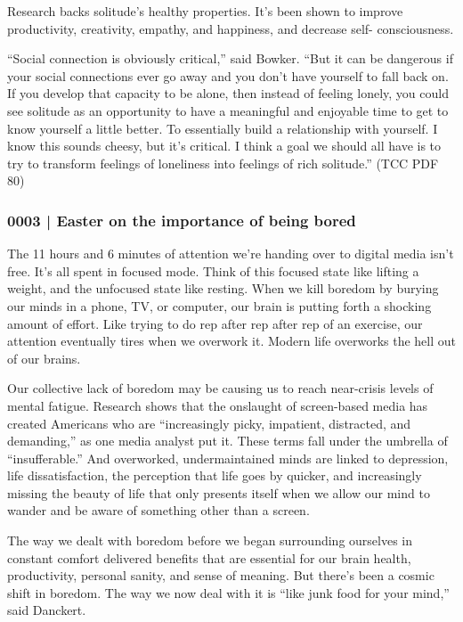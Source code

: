 			Research backs solitude's healthy properties. It's been shown to improve productivity, creativity, empathy, and happiness, and decrease self- consciousness. 

			``Social connection is obviously critical,'' said Bowker. ``But it can be dangerous if your social connections ever go away and you don't have yourself to fall back on. If you develop that capacity to be alone, then instead of feeling lonely, you could see solitude as an opportunity to have a meaningful and enjoyable time to get to know yourself a little better. To essentially build a relationship with yourself. I know this sounds cheesy, but it's critical. I think a goal we should all have is to try to transform feelings of loneliness into feelings of rich solitude.'' (TCC PDF 80)
			
		\subsubsection{0003 | Easter on the importance of being bored}
			\label{GM-LIFE-WORLD-0003}
			
			The 11 hours and 6 minutes of attention we're handing over to digital media isn't free. It's all spent in focused mode. Think of this focused state like lifting a weight, and the unfocused state like resting. When we kill boredom by burying our minds in a phone, TV, or computer, our brain is putting forth a shocking amount of effort. Like trying to do rep after rep after rep of an exercise, our attention eventually tires when we overwork it. Modern life overworks the hell out of our brains.

			Our collective lack of boredom may be causing us to reach near-crisis levels of mental fatigue. Research shows that the onslaught of screen-based media has created Americans who are ``increasingly picky, impatient, distracted, and demanding,'' as one media analyst put it. These terms fall under the umbrella of ``insufferable.'' And overworked, undermaintained minds are linked to depression, life dissatisfaction, the perception that life goes by quicker, and increasingly missing the beauty of life that only presents itself when we allow our mind to wander and be aware of something other than a screen.
			
			The way we dealt with boredom before we began surrounding ourselves in constant comfort delivered benefits that are essential for our brain health, productivity, personal sanity, and sense of meaning. But there's been a cosmic shift in boredom. The way we now deal with it is ``like junk food for your mind,'' said Danckert.
			
